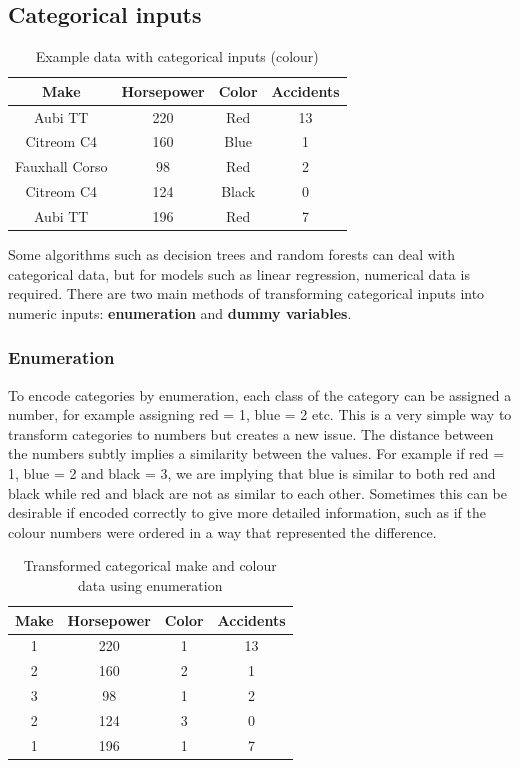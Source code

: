 \documentclass[CS5104-Notes.tex]{subfiles}
\begin{document}
\subsection{Categorical inputs}
\begin{table}[H]
\centering
\begin{tabular}{| c | c | c | c |}
\hline
\textbf{Make} & \textbf{Horsepower} & \textbf{Color} & \textbf{Accidents} \\
\hline
Aubi TT & 220 & Red & 13 \\
\hline
Citreom C4 & 160 & Blue & 1 \\
\hline
Fauxhall Corso & 98 & Red & 2 \\
\hline
Citreom C4 & 124 & Black & 0 \\
\hline
Aubi TT & 196 & Red & 7  \\
\hline
\end{tabular}
\caption{Example data with categorical inputs (colour)}
\end{table}
Some algorithms such as decision trees and random forests can deal with categorical data, but for models such as linear regression, numerical data is required. There are two main methods of transforming categorical inputs into numeric inputs: \textbf{enumeration} and \textbf{dummy variables}.
\subsubsection{Enumeration}
To encode categories by enumeration, each class of the category can be assigned a number, for example assigning red = 1, blue = 2 etc. This is a very simple way to transform categories to numbers but creates a new issue. The distance between the numbers subtly implies a similarity between the values. For example if red = 1, blue = 2 and black = 3, we are implying that blue is similar to both red and black while red and black are not as similar to each other. Sometimes this can be desirable if encoded correctly to give more detailed information, such as if the colour numbers were ordered in a way that represented the difference. 
\begin{table}[H]
\centering
\begin{tabular}{| c | c | c | c |}
\hline
\textbf{Make} & \textbf{Horsepower} & \textbf{Color} & \textbf{Accidents} \\
\hline
1 & 220 & 1 & 13 \\
\hline
2 & 160 & 2 & 1 \\
\hline
3 & 98 & 1 & 2 \\
\hline
2 & 124 & 3 & 0 \\
\hline
1 & 196 & 1 & 7  \\
\hline
\end{tabular}
\caption{Transformed categorical make and colour data using enumeration}
\end{table}
\end{document}
